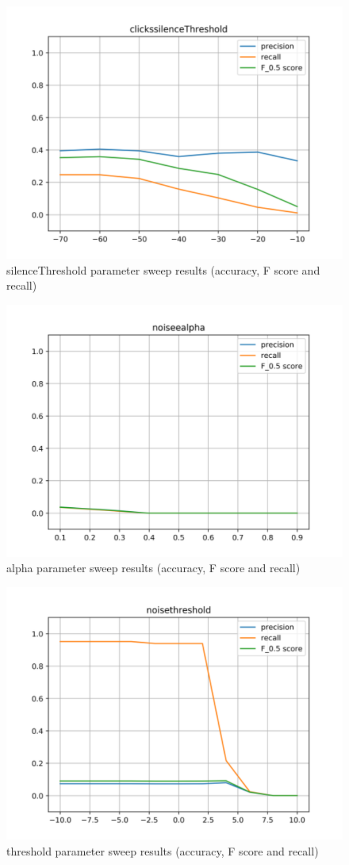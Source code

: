 \begin{figure}[H]
	\includegraphics[clip,width=0.7\columnwidth]{Figures/clickssilenceThreshold.png}%
	\caption{silenceThreshold parameter sweep results (accuracy, F score and recall)}
	\label{fig:clickssilenceThreshold}
\end{figure}

\begin{figure}[H]
	\includegraphics[clip,width=0.7\columnwidth]{Figures/noiseealpha.png}%
	\caption{alpha parameter sweep results (accuracy, F score and recall)}
	\label{fig:noiseealpha}
\end{figure}

\begin{figure}[H]
	\includegraphics[clip,width=0.7\columnwidth]{Figures/noisethreshold.png}%
	\caption{threshold parameter sweep results (accuracy, F score and recall)}
	\label{fig:noisethreshold}
\end{figure}

